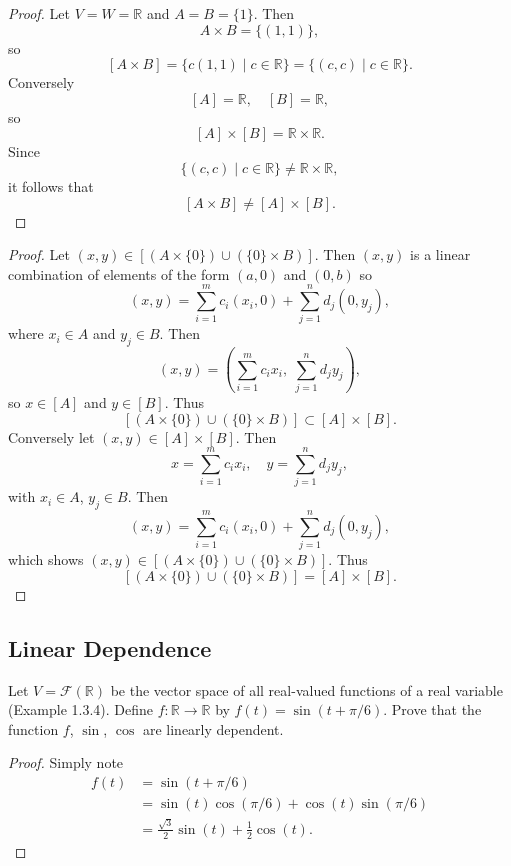 \begin{proof}
    Let $V = W = \mathbb{R}$ and $A = B = \{1\}$.
    Then
    \[
    A \times B = \{(1,1)\},
    \]
    so
    \[
    [A \times B] = \{c(1,1) \mid c \in \mathbb{R}\}
    = \{(c,c) \mid c \in \mathbb{R}\}.
    \]
    Conversely
    \[
    [A] = \mathbb{R}, \quad [B] = \mathbb{R},
    \]
    so
    \[
    [A] \times [B] = \mathbb{R} \times \mathbb{R}.
    \]
    Since
    \[
    \{(c,c) \mid c \in \mathbb{R}\} \ne \mathbb{R} \times \mathbb{R},
    \]
    it follows that
    \[
    [A \times B] \ne [A] \times [B].
    \]
\end{proof}

\begin{proof}
    Let $(x,y) \in [(A \times \{0\}) \cup (\{0\} \times B)]$.
    Then $(x,y)$ is a linear combination of elements of the form $(a,0)$ and $(0,b)$ so
    \[
    (x,y) = \sum_{i=1}^m c_i (x_i,0) + \sum_{j=1}^n d_j (0,y_j),
    \]
    where $x_i \in A$ and $y_j \in B$.
    Then
    \[
    (x,y) = \left(\sum_{i=1}^m c_i x_i,\; \sum_{j=1}^n d_j y_j \right),
    \]
    so $x \in [A]$ and $y \in [B]$. Thus
    \[
    [(A \times \{0\}) \cup (\{0\} \times B)] \subset [A] \times [B].
    \]
    Conversely let $(x,y) \in [A] \times [B]$. Then
    \[
    x = \sum_{i=1}^m c_i x_i, \quad y = \sum_{j=1}^n d_j y_j,
    \]
    with $x_i \in A$, $y_j \in B$. Then
    \[
    (x,y) = \sum_{i=1}^m c_i (x_i,0) + \sum_{j=1}^n d_j (0,y_j),
    \]
    which shows $(x,y) \in [(A \times \{0\}) \cup (\{0\} \times B)]$.
    Thus
    \[
    [(A \times \{0\}) \cup (\{0\} \times B)] = [A] \times [B].
    \]
\end{proof}

\subsection{Linear Dependence}


\begin{tcolorbox}[title=Problem 1, breakable]
    Let $V = \mathcal{F}(\mathbb{R})$ be the vector 
    space of all real-valued functions of a real 
    variable (Example 1.3.4). Define $f : \mathbb{R} \longrightarrow \mathbb{R}$
    by $f(t) = \sin(t + \pi / 6)$. Prove that the function $f$,
    $\sin$, $\cos$ are linearly dependent.
\end{tcolorbox}

\begin{proof}
    Simply note 
    \begin{align*}
        f(t) &= \sin(t + \pi/6) \\
             &= \sin(t) \cos(\pi/6) + \cos(t)\sin(\pi/6) \\
             &= \frac{\sqrt{3}}{2} \sin(t) + \frac{1}{2} \cos(t).
    \end{align*}
\end{proof}

